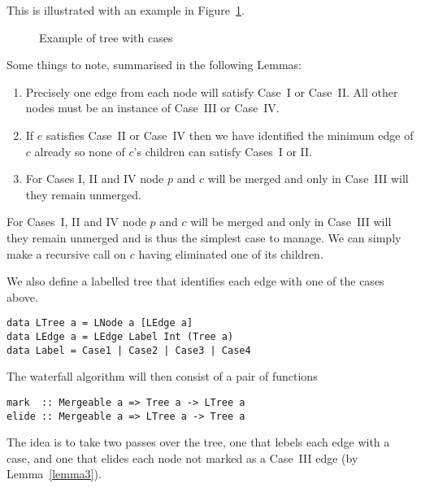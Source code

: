 \documentclass{jfp}
\begin{document}
This is illustrated with an example in Figure~\ref{fig:cases}.

\begin{figure}
\centering
\ifpdf
\else
\fi
\caption{Example of tree with cases}
\label{fig:cases}
\end{figure}


Some things to note, summarised in the following Lemmas:
\begin{enumerate}

\item Precisely one edge from each node will satisfy Case~I or
  Case~II. All other nodes must be an instance of Case~III or Case~IV.
\label{lemma1}

\item If $e$ satisfies Case~II or Case~IV then we have identified the
  minimum edge of $c$ already so none of $c$'s children can satisfy
  Cases~I or II.
\label{lemma2}

\item For Cases I, II and IV node $p$ and $c$ will be merged and only
  in Case~III will they remain unmerged.
\label{lemma3}

\end{enumerate}

For Cases~I, II and IV node $p$ and $c$ will be merged and only in Case~III
will they remain unmerged and is thus the simplest case to manage.  We
can simply make a recursive call on $c$ having eliminated one of its
children.



We also define a labelled tree that identifies each edge with one of
the cases above.

\begin{verbatim}
data LTree a = LNode a [LEdge a]
data LEdge a = LEdge Label Int (Tree a)
data Label = Case1 | Case2 | Case3 | Case4
\end{verbatim}

The waterfall algorithm will then consist of a pair of functions

\begin{verbatim}
mark  :: Mergeable a => Tree a -> LTree a
elide :: Mergeable a => LTree a -> Tree a
\end{verbatim}

The idea is to take two passes over the tree, one that lebels each
edge with a case, and one that elides each node not marked as a
Case~III edge (by Lemma~\ref{lemma3}).
\end{document}
